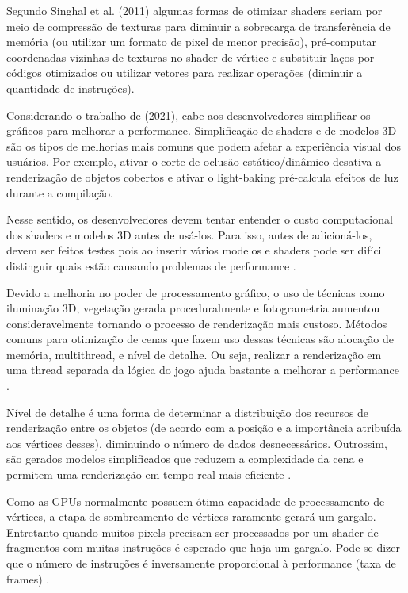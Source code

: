 Segundo Singhal et al. (2011) algumas formas de otimizar shaders seriam por meio de compressão de texturas para diminuir a sobrecarga de transferência de memória (ou utilizar um formato de pixel de menor precisão), pré-computar coordenadas vizinhas de texturas no shader de vértice e substituir laços por códigos otimizados ou utilizar vetores para realizar operações (diminuir a quantidade de instruções).

Considerando o trabalho de  (2021), cabe aos desenvolvedores simplificar os gráficos para melhorar a performance. Simplificação de shaders e de modelos 3D são os tipos de melhorias mais comuns que podem afetar a experiência visual dos usuários. Por exemplo, ativar o corte de oclusão estático/dinâmico desativa a renderização de objetos cobertos e ativar o \Gls{light-baking} pré-calcula efeitos de luz durante a compilação.

Nesse sentido, os desenvolvedores devem tentar entender o custo computacional dos shaders e modelos 3D antes de usá-los. Para isso, antes de adicioná-los, devem ser feitos testes pois ao inserir vários modelos e shaders pode ser difícil distinguir quais estão causando problemas de performance \cite{nusrat2021commit}.

Devido a melhoria no poder de processamento gráfico, o uso de técnicas como iluminação 3D, vegetação gerada proceduralmente e fotogrametria aumentou consideravelmente tornando o processo de renderização mais custoso. Métodos comuns para otimização de cenas que fazem uso dessas técnicas são alocação de memória, \Gls{multithread}, e nível de detalhe. Ou seja, realizar a renderização em uma thread separada da lógica do jogo ajuda bastante a melhorar a performance \cite{zhang2017vegetation}.

Nível de detalhe é uma forma de determinar a distribuição dos recursos de renderização entre os objetos (de acordo com a posição e a importância atribuída aos vértices desses), diminuindo o número de dados desnecessários. Outrossim, são gerados modelos simplificados que reduzem a complexidade da cena e permitem uma renderização em tempo real mais eficiente \cite{zhang2017vegetation}.

Como as GPUs normalmente possuem ótima capacidade de processamento de vértices, a etapa de sombreamento de vértices raramente gerará um gargalo. Entretanto quando muitos pixels precisam ser processados por um shader de fragmentos com muitas instruções é esperado que haja um gargalo. Pode-se dizer que o número de instruções é inversamente proporcional à performance (taxa de frames) \cite{optimizationMobile}.

